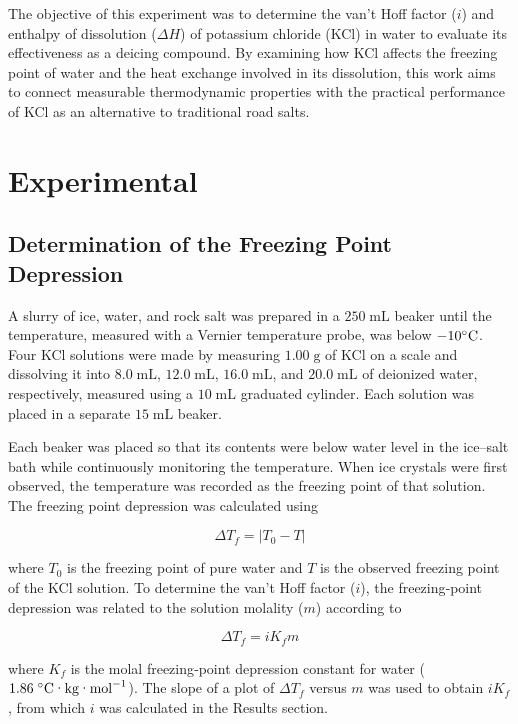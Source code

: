 \documentclass[11pt,letterpaper]{article}
\begin{document}
The objective of this experiment was to determine the van’t Hoff factor ($i$) and enthalpy of dissolution ($\Delta H$) of potassium chloride (KCl) in water to evaluate its effectiveness as a deicing compound. By examining how KCl affects the freezing point of water and the heat exchange involved in its dissolution, this work aims to connect measurable thermodynamic properties with the practical performance of KCl as an alternative to traditional road salts.

\section*{Experimental}

\subsection*{Determination of the Freezing Point Depression}

A slurry of ice, water, and rock salt was prepared in a $250\;\text{mL}$ beaker until the temperature, measured with a Vernier temperature probe, was below $-10^\circ\text{C}$. Four KCl solutions were made by measuring $1.00\;\text{g}$ of KCl on a scale and dissolving it into $8.0\;\text{mL}$, $12.0\;\text{mL}$, $16.0\;\text{mL}$, and $20.0\;\text{mL}$ of deionized water, respectively, measured using a $10\;\text{mL}$ graduated cylinder. Each solution was placed in a separate $15\;\text{mL}$ beaker.

Each beaker was placed so that its contents were below water level in the ice–salt bath while continuously monitoring the temperature. When ice crystals were first observed, the temperature was recorded as the freezing point of that solution. The freezing point depression was calculated using

\begin{equation}
\Delta T_f = |T_0 - T|
\label{eq:deltaTf}
\end{equation}

where $T_0$ is the freezing point of pure water and $T$ is the observed freezing point of the KCl solution.  
To determine the van’t Hoff factor ($i$), the freezing‐point depression was related to the solution molality ($m$) according to

\begin{equation}
\Delta T_f = iK_f m
\label{eq:vantHoff}
\end{equation}

where $K_f$ is the molal freezing‐point depression constant for water ($1.86\;^\circ\text{C·kg·mol}^{-1}$). The slope of a plot of $\Delta T_f$ versus $m$ was used to obtain $iK_f$, from which $i$ was calculated in the Results section.
\end{document}
